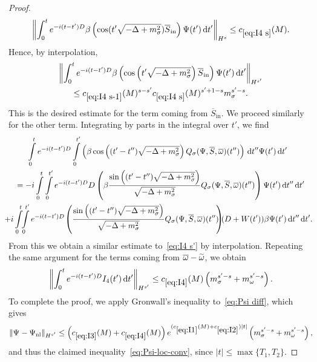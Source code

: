 \documentclass[AHL,Unicode,longabstracts,published]{cedram}
\newcommand{\rmin}{\mathrm{in}}
\newcommand{\nl}{\mathrm{nl}}
\renewcommand\tilde{\widetilde}
\renewcommand\d[1]{{\ensuremath{\,\text{d}#1}}}
\let\oldtilde\tilde
\renewcommand*{\tilde}[1]{\mathchoice{\widetilde{#1}}{\widetilde{#1}}{\oldtilde{#1}}{\oldtilde{#1}}}
\begin{document}
\begin{proof}
\begin{equation}
\left\| \int_0^t e^{-i(t-t')D}\beta \left(\cos(t'\sqrt{-\Delta + m^2_\sigma})\overline{S}_\rmin\right)\Psi(t') \d t'\right\|_{H^{s}}
\leq c_{\eqref{eq:I4 s}} (M).
\end{equation}
Hence, by interpolation,
\begin{multline}\label{eq:I4 s'}
\left\| \int_0^t e^{-i(t-t')D}\beta \left(\cos\left(t'\sqrt{-\Delta + m^2_\sigma}\right)\overline{S}_\rmin\right)\Psi(t') \d t'\right\|_{H^{s'}}\\
\leq c_{\eqref{eq:I4 s-1}}(M)^{s-s'} c_{\eqref{eq:I4 s}}(M)^{s'+1-s} m_\sigma^{s'-s}.
\end{multline}
This is the desired estimate for the term coming from $\overline{S}_\rmin$. We proceed similarly for the other term. Integrating by parts in the integral over $t'$, we find
\begin{multline*}
\mkern-14mu\int\limits_0^t e^{-i(t-t')D}\int\limits_0^{t'} \left(\beta\cos\left((t'-t'')\sqrt{-\Delta + m^2_\sigma}\right) Q_\sigma(\Psi,\overline{S}, \overline{\omega})(t'')\right)\d t'' \Psi(t')\d t' \\
= -i \int\limits_0^t \int\limits_0^{t'} e^{-i(t-t')D} D \left(\beta \frac{\sin\left((t'-t'')\sqrt{-\Delta + m^2_\sigma}\right)}{\sqrt{-\Delta + m^2_\sigma}} Q_\sigma(\Psi,\overline{S}, \overline{\omega})(t'')\right) \Psi(t')\d t'' \d t'\\
\mkern-10mu + i \int\limits_0^t\!\!\int\limits_0^{t'} e^{-i(t-t')D}\hspace{-1pt}\left(\frac{\sin\left((t'-t'')\sqrt{-\Delta + m^2_\sigma}\right)}{\sqrt{-\Delta + m^2_\sigma}} Q_\sigma(\Psi,\overline{S}, \overline{\omega})(t'')\!\!\right)\hspace{-4pt}(D+W(t'))\beta\Psi(t')\d t'' \d t'.
\end{multline*}
From this we obtain a similar estimate to~\eqref{eq:I4 s'} by interpolation. Repeating the same argument for the terms coming from $\overline{\omega}-\tilde{\omega}$, we obtain
\begin{equation}\label{eq:I4}
\left\|\int_0^te^{-i(t-t')D}I_4(t')\d t'\right\|_{H^{s'}}\leq c_{\eqref{eq:I4}}(M) \left(m_\sigma^{s'-s} + m_\omega^{s'-s}\right).
\end{equation}
To complete the proof, we apply Gronwall's inequality to~\eqref{eq:Psi diff}, which gives
\begin{equation}
\|\Psi_{{}}-\Psi_{\nl}\|_{H^{s'}}
\leq \left(c_{\eqref{eq:I3}}(M) + c_{\eqref{eq:I4}}(M)\right)e^{(c_{\eqref{eq:I1}}(M) +c_{\eqref{eq:I2}}) |t|} \left(m_\sigma^{s'-s}+m_{\omega}^{s'-s}\right),
\end{equation}
and thus the claimed inequality~\eqref{eq:Psi-loc-conv}, since $|t|\leq \max\{T_1,T_2\}$.
\end{proof}
\end{document}
